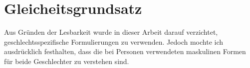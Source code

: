 \chapter*{Gleicheitsgrundsatz}
Aus Gründen der Lesbarkeit wurde in dieser Arbeit darauf verzichtet, geschlechtsspezifische Formulierungen zu verwenden. Jedoch mochte ich ausdrücklich festhalten, dass die bei Personen verwendeten maskulinen Formen für beide Geschlechter zu verstehen sind.
